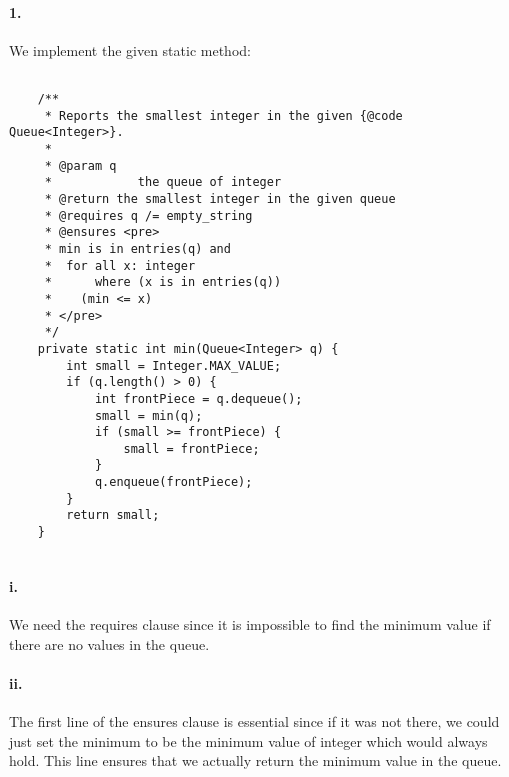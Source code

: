 \documentclass[10pt]{article}
\begin{document}
\maketitle

\paragraph{1. } We implement the given static method: 
\begin{lstlisting} 

    /**
     * Reports the smallest integer in the given {@code Queue<Integer>}.
     *
     * @param q
     *            the queue of integer
     * @return the smallest integer in the given queue
     * @requires q /= empty_string
     * @ensures <pre>
     * min is in entries(q) and
     *  for all x: integer
     *      where (x is in entries(q))
     *    (min <= x)
     * </pre>
     */
    private static int min(Queue<Integer> q) {
        int small = Integer.MAX_VALUE;
        if (q.length() > 0) {
            int frontPiece = q.dequeue();
            small = min(q);
            if (small >= frontPiece) {
                small = frontPiece;
            }
            q.enqueue(frontPiece);
        }
        return small;
    }
   

\end{lstlisting}

\paragraph{i. } We need the requires clause since it is impossible to find the minimum value if there are no values in the queue. 
\paragraph{ii. }The first line of the ensures clause is essential since if it was not there, we could just set the minimum to be the minimum value of integer which would always hold. This line ensures that we actually return the minimum value in the queue. 
\end{document}
